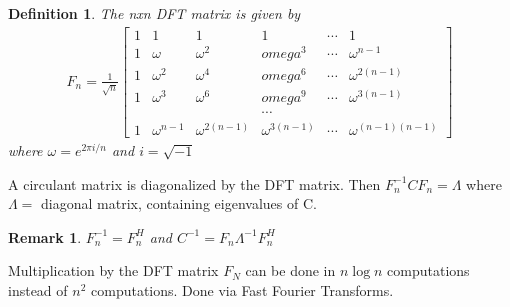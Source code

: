 \documentclass[12pt]{amsart}
\newtheorem{definition}{Definition} %
\newtheorem*{remark}{Remark}        %
\numberwithin{equation}{theorem}    %
\begin{document}
\begin{definition}
    The nxn DFT matrix is given by
    \begin{align*}
        F_n = \frac{1}{\sqrt{n}} \begin{bmatrix}
            1 & 1            & 1               & 1               & \cdots & 1                   \\
            1 & \omega       & \omega^2        & omega^3         & \cdots & \omega^{n-1}        \\
            1 & \omega^2     & \omega^4        & omega^6         & \cdots & \omega^{2(n-1)}     \\
            1 & \omega^3     & \omega^6        & omega^9         & \cdots & \omega^{3(n-1)}     \\
              &              &                 & \cdots          &        &                     \\
            1 & \omega^{n-1} & \omega^{2(n-1)} & \omega^{3(n-1)} & \cdots & \omega^{(n-1)(n-1)}
        \end{bmatrix}
    \end{align*}
    where $\omega = e^{2\pi i / n}$ and $i=\sqrt{-1}$
\end{definition}

\begin{theorem}
    A circulant matrix is diagonalized by the DFT matrix. Then $F_{n}^{-1} C F_n = \Lambda$ where $\Lambda=$ diagonal matrix, containing eigenvalues of C.
    \begin{remark}
        $F_{n}^{-1} = F_{n}^{H}$ and $C^{-1}=F_n \Lambda^{-1}F_{n}^{H}$
    \end{remark}
    Multiplication by the DFT matrix $F_N$ can be done in $n\log{n}$ computations instead of $n^2$ computations. Done via Fast Fourier Transforms.
\end{theorem}
\end{document}
